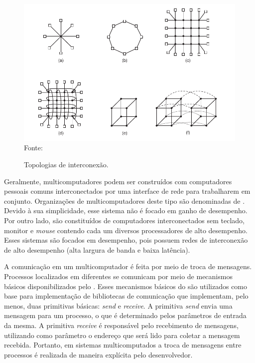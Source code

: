 \begin{figure}[t]
	\centering
        \caption{Topologias de interconexão.}
	\includegraphics[width=\textwidth]{figs/topologia.pdf} \\
    Fonte:~\cite{Tanenbaum2015}
    \label{fig:topologia}
\end{figure}


Geralmente, multicomputadores podem ser construídos com computadores pessoais
comuns interconectados por uma interface de rede para trabalharem em
conjunto. Organizações de multicomputadores deste tipo são denominadas de \now. Devido à sua
simplicidade, esse sistema não é focado em ganho de desempenho. Por outro lado, \cow
são constituídos de computadores interconectados sem teclado, monitor e \textit{mouse} contendo cada
um diversos processadores de alto desempenho. Esses sistemas são focados em desempenho, pois
possuem redes de interconexão de alto desempenho (alta largura de banda e baixa latência).

A comunicação em um multicomputador é feita por meio de troca de mensagens.
Processos localizados em diferentes \cpus se comunicam por meio de mecanismos básicos
disponibilizados pelo \so. Esses mecanismos básicos do \so são utilizados como base para implementação
de bibliotecas de comunicação que implementam, pelo menos, duas primitivas básicas: \textit{send} e \textit{receive}.
A primitiva \textit{send} envia uma mensagem para um processo, o que é determinado pelos
parâmetros de entrada da mesma. A primitiva \textit{receive} é responsável pelo recebimento
de mensagens, utilizando como parâmetro o endereço que será lido para coletar a
mensagem recebida. Portanto, em sistemas multicomputados a troca de mensagens
entre processos é realizada de maneira explícita pelo desenvolvedor.


